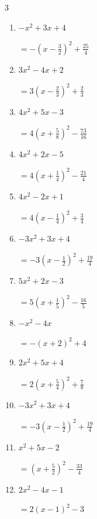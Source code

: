 \begin{multicols}{3}
\begin{enumerate}
  \item $-x^{2}+3x+4$

        $\displaystyle =-\left( x-\frac{3}{2}\right)^{2}+\frac{25}{4}$

  \item $3x^{2}-4x+2$

        $\displaystyle =3\left( x-\frac{2}{3}\right)^{2}+\frac{2}{3}$

\columnbreak %

  \item $4x^{2}+5x-3$

        $\displaystyle =4\left( x+\frac{5}{8}\right)^{2}-\frac{73}{16}$

  \item $4x^{2}+2x-5$

        $\displaystyle =4\left( x+\frac{1}{4}\right)^{2}-\frac{21}{4}$

  \item $4x^{2}-2x+1$

        $\displaystyle =4\left( x-\frac{1}{4}\right)^{2}+\frac{3}{4}$

  \item $-3x^{2}+3x+4$

        $\displaystyle =-3\left( x-\frac{1}{2}\right)^{2}+\frac{19}{4}$

  \item $5x^{2}+2x-3$

        $\displaystyle =5\left( x+\frac{1}{5}\right)^{2}-\frac{16}{5}$

\columnbreak %

  \item $-x^{2}-4x$

        $\displaystyle =-\left( x+2\right)^{2}+4$

  \item $2x^{2}+5x+4$

        $\displaystyle =2\left( x+\frac{5}{4}\right)^{2}+\frac{7}{8}$

  \item $-3x^{2}+3x+4$

        $\displaystyle =-3\left( x-\frac{1}{2}\right)^{2}+\frac{19}{4}$

  \item $x^{2}+5x-2$

        $\displaystyle =\left( x+\frac{5}{2}\right)^{2}-\frac{33}{4}$

  \item $2x^{2}-4x-1$

        $\displaystyle =2\left( x-1\right)^{2}-3$


\end{enumerate}
\end{multicols}
